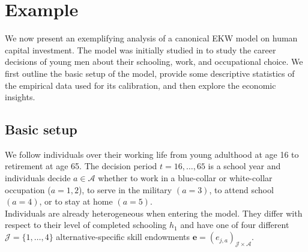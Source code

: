 \section{Example}\label{Example}
We now present an exemplifying analysis of a canonical EKW model on human capital investment. The model was initially studied in \citet{Keane.1997} to study the career decisions of young men about their schooling, work, and occupational choice. We first outline the basic setup of the model, provide some descriptive statistics of the empirical data used for its calibration, and then explore the economic insights.
\subsection{Basic setup}
%
%
We follow individuals over their working life from young adulthood at age 16 to retirement at age 65. The decision period $t = 16, \dots, 65$  is a school year and individuals decide $a\in\mathcal{A}$ whether to work in a blue-collar or white-collar occupation ($a = 1, 2$), to serve in the military $(a = 3)$, to attend school $(a = 4)$, or to stay at home $(a = 5)$.\\

\noindent Individuals are already heterogeneous when entering the model. They differ with respect to their level of completed schooling $h_1$ and have one of four different $\mathcal{J} = \{1, \hdots, 4\}$ alternative-specific skill endowments $\bm{e} = \left(e_{j,a}\right)_{\mathcal{J} \times \mathcal{A}}$.\\

